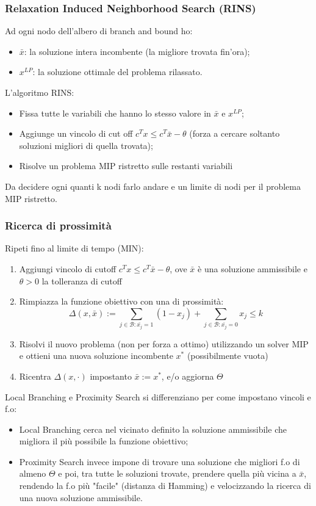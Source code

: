 \subsubsection*{Relaxation Induced Neighborhood Search (RINS)}
Ad ogni nodo dell'albero di branch and bound ho:
\begin{itemize}
	\item $\bar{x}$: la soluzione intera incombente (la migliore trovata fin'ora);
	\item $x^{LP}$: la soluzione ottimale del problema rilassato.
\end{itemize}
L'algoritmo RINS:
\begin{itemize}
	\item Fissa tutte le variabili che hanno lo stesso valore in $\bar{x}$ e $x^{LP}$;
	\item Aggiunge un vincolo di cut off $c^Tx\le c^T\bar{x}-\theta$ (forza a cercare soltanto soluzioni migliori di quella trovata);
	\item Risolve un problema MIP ristretto sulle restanti variabili
\end{itemize}
Da decidere ogni quanti k nodi farlo andare e un limite di nodi per il problema MIP ristretto.
\subsubsection*{Ricerca di prossimità}
Ripeti fino al limite di tempo (MIN):
\begin{enumerate}
	\item Aggiungi vincolo di cutoff $c^Tx\le c^T\bar{x}-\theta$, ove $\bar{x}$ è una soluzione ammissibile e $\theta > 0$ la tolleranza di cutoff
	\item Rimpiazza la funzione obiettivo con una di prossimità:
	\begin{equation*}
		\Delta (x,\bar{x}) := \sum_{j\in \mathcal{B}: \bar{x_j}=1}(1-x_j)+\sum_{j\in \mathcal{B}: \bar{x_j}=0}x_j\le k
	\end{equation*}
	\item Risolvi il nuovo problema (non per forza a ottimo) utilizzando un solver MIP e ottieni una nuova soluzione incombente $x^*$ (possibilmente vuota)
	\item Ricentra $\Delta (x,\cdot)$ impostanto $\bar{x} := x^*$, e/o aggiorna $\Theta$
\end{enumerate}
Local Branching e Proximity Search si differenziano per come impostano vincoli e f.o:
\begin{itemize}
	\item Local Branching cerca nel vicinato definito la soluzione ammissibile che migliora il più possibile la funzione obiettivo;
	\item Proximity Search invece impone di trovare una soluzione che migliori f.o di almeno $\Theta$ e poi, tra tutte le soluzioni trovate, prendere quella più vicina a $\bar{x}$, rendendo la f.o più "facile" (distanza di Hamming) e velocizzando la ricerca di una nuova soluzione ammissibile.
\end{itemize}
